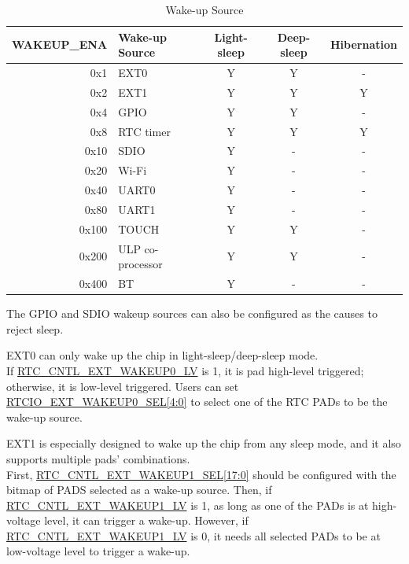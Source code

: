 \begin{table}[H]
    \centering
    \caption{Wake-up Source}
    \label{tab:lpm-wakeup-source}
    \begin{threeparttable}
    \begin{tabular}{| r | l | c | c | c |}
    \hline
    \rowcolor{lightgray}
    \textbf{WAKEUP\_ENA} & \textbf{Wake-up Source\tnote{1}} &  \textbf{Light-sleep} & \textbf{Deep-sleep} & \textbf{Hibernation} \\\hline
        0x1 & EXT0\tnote{2} & Y & Y & - \\\hline
        0x2 & EXT1\tnote{3} & Y & Y & Y \\\hline
        0x4 & GPIO\tnote{4} & Y & Y & - \\\hline
        0x8 & RTC timer & Y & Y & Y \\\hline
        0x10 & SDIO\tnote{5} & Y & - & - \\\hline
        0x20 & Wi-Fi\tnote{6} & Y & - & - \\\hline
        0x40 & UART0 \tnote{7}& Y & - & - \\\hline
        0x80 & UART1 \tnote{7} & Y & - & - \\\hline
        0x100 & TOUCH & Y & Y & - \\\hline
        0x200 & ULP co-processor & Y & Y & - \\\hline
        0x400 & BT \tnote{6}& Y & - & -  \\\hline
    \end{tabular}
    \begin{tablenotes}
        \item[1] The GPIO and SDIO wakeup sources can also be configured as the causes to reject sleep.
        \item[2] EXT0 can only wake up the chip in light-sleep/deep-sleep mode. \\If \hyperref[regdesc:RTCCNTLEXTWAKEUPCONFREG]{RTC\_CNTL\_EXT\_WAKEUP0\_LV} is 1, it is pad high-level triggered; otherwise, it is low-level triggered. Users can set \hyperref[regdesc:RTCIOEXTWAKEUP0REG]{RTCIO\_EXT\_WAKEUP0\_SEL[4:0]} to select one of the RTC PADs to be the wake-up source.
        \item[3] EXT1 is especially designed to wake up the chip from any sleep mode, and it also supports multiple pads' combinations. \\First, \hyperref[regdesc:RTCCNTLEXTWAKEUP1REG]{RTC\_CNTL\_EXT\_WAKEUP1\_SEL[17:0]} should be configured with the bitmap of PADS selected as a wake-up source. Then, if \hyperref[regdesc:RTCCNTLEXTWAKEUPCONFREG]{RTC\_CNTL\_EXT\_WAKEUP1\_LV} is 1, as long as one of the PADs is at high-voltage level, it can trigger a wake-up. However, if \hyperref[regdesc:RTCCNTLEXTWAKEUPCONFREG]{RTC\_CNTL\_EXT\_WAKEUP1\_LV} is 0, it needs all selected PADs to be at low-voltage level to trigger a wake-up.


\end{tablenotes}
\end{threeparttable}
\end{table}
